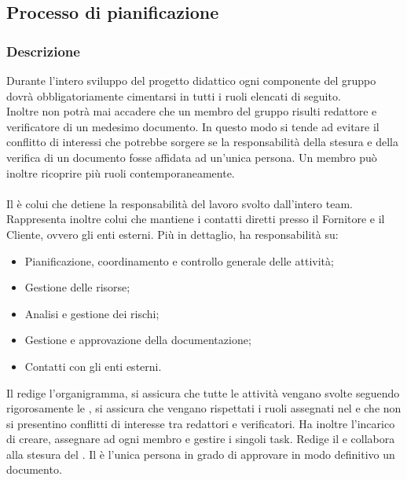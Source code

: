 \subsection{Processo di pianificazione}

\subsubsection{Descrizione}
Durante l'intero sviluppo del progetto didattico ogni componente del gruppo 
dovrà obbligatoriamente cimentarsi in tutti i ruoli elencati di seguito. \\
Inoltre non potrà mai accadere che un membro del gruppo risulti redattore e verificatore di un medesimo documento. 
In questo modo si tende ad evitare il conflitto di interessi che potrebbe sorgere se la responsabilità della stesura 
e della verifica di un documento fosse affidata ad un'unica persona.
Un membro può inoltre ricoprire più ruoli contemporaneamente.

\paragraph{\RdP}
Il \textsl{\RdP} è colui che detiene la responsabilità del 
lavoro svolto dall'intero team. Rappresenta inoltre colui che mantiene i 
contatti diretti presso il Fornitore e il Cliente, ovvero gli enti esterni. Più 
in dettaglio, ha responsabilità su:
\begin{itemize}
  \item Pianificazione, coordinamento e controllo generale delle attività;
  \item Gestione delle risorse;
  \item Analisi e gestione dei rischi;
  \item Gestione e approvazione della documentazione;
  \item Contatti con gli enti esterni.
\end{itemize}
Il \textsl{\RdP} redige l'organigramma, si assicura che 
tutte le attività vengano svolte seguendo rigorosamente le \textsl{\NdP}, si 
assicura che vengano rispettati i ruoli assegnati nel \textsl{\PdP} e che non si 
presentino conflitti di interesse tra redattori e verificatori. Ha inoltre 
l'incarico di creare, assegnare ad ogni membro e gestire i singoli task. Redige 
il \textsl{\PdP} e collabora alla stesura del \textsl{\PdQ}. Il \textsl{\RdP} è 
l'unica persona in grado di approvare in modo definitivo un documento.

